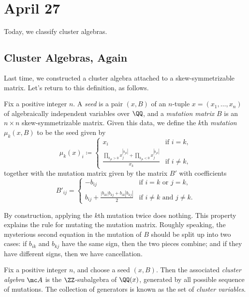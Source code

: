 \documentclass[../notes.tex]{subfiles}
\begin{document}
\section{April 27}
Today, we classify cluster algebras.

\subsection{Cluster Algebras, Again}
Last time, we constructed a cluster algebra attached to a skew-symmetrizable matrix. Let's return to this definition, as follows.
\begin{definition}[mutation]
	Fix a positive integer $n$. A \textit{seed} is a pair $(x,B)$ of an $n$-tuple $x=(x_1,\ldots,x_n)$ of algebraically independent variables over $\QQ$, and a \textit{mutation matrix} $B$ is an $n\times n$ skew-symmetrizable matrix. Given this data, we define the $k$th \textit{mutation} $\mu_k(x,B)$ to be the seed given by
	\[\mu_k(x)_i\coloneqq\begin{cases}
		x_i & \text{if }i=k, \\
		\frac{\displaystyle\prod_{b_{jk}>0}x_j^{\left|b_{jk}\right|}+\displaystyle\prod_{b_{jk}<0}x_j^{\left|b_{jk}\right|}}{\displaystyle x_k} & \text{if }i\ne k,
	\end{cases}\]
	together with the mutation matrix given by the matrix $B'$ with coefficients
	\[B'_{ij}=\begin{cases}
		-b_{ij} & \text{if }i=k\text{ or }j=k, \\
		b_{ij}+\frac{\left|b_{ik}\right|b_{kj}+b_{ik}\left|b_{kj}\right|}2 & \text{if }i\ne k\text{ and }j\ne k.
	\end{cases}\]
\end{definition}
\begin{remark}
	By construction, applying the $k$th mutation twice does nothing. This property explains the rule for mutating the mutation matrix. Roughly speaking, the mysterious second equation in the mutation of $B$ should be split up into two cases: if $b_{ik}$ and $b_{kj}$ have the same sign, then the two pieces combine; and if they have different signs, then we have cancellation.
\end{remark}
\begin{definition}
	Fix a positive integer $n$, and choose a seed $(x,B)$. Then the associated \textit{cluster algebra} $\mc A$ is the $\ZZ$-subalgebra of $\QQ(x)$, generated by all possible sequence of mutations. The collection of generators is known as the set of \textit{cluster variables}.
\end{definition}
\end{document}

